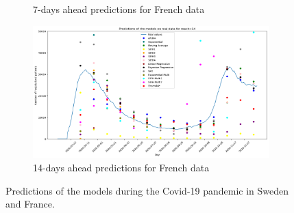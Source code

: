 \begin{figure}[h!]
\begin{subfigure}[b]{0.5\textwidth}
        \caption{7-days ahead predictions for French data}
        \label{fig:sousfig1F}
      \end{subfigure}
      \hfill
      \begin{subfigure}[b]{0.5\textwidth}
        \centering
        \includegraphics[width=\textwidth]{figures/real_data_France_14.png}  
        \caption{14-days ahead predictions for French data}
        \label{fig:sousfig2F}
      \end{subfigure}
    \caption{Predictions of the models during the Covid-19 pandemic in Sweden and France.}
    \label{fig:real_data}
\end{figure}